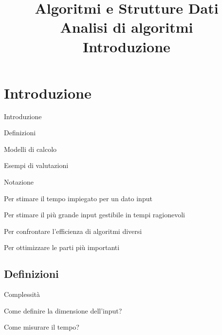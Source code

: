 

\usepackage{epigraph}

\title[ASD - Analisi di algoritmi]{\textbf{Algoritmi e Strutture Dati}\\[24pt]Analisi di algoritmi\\Introduzione}

\graphicspath{{figs/02/}}




\FrameTitle{}

\FrameContent

\section{Introduzione}

\begin{frame}{Introduzione}

\BIL
\item Definizioni
\item Modelli di calcolo
\item Esempi di valutazioni
\item Notazione
\EIL

\BI
\item Per stimare il tempo impiegato per un dato input
\item Per stimare il più grande input gestibile in tempi ragionevoli
\item Per confrontare l'efficienza di algoritmi diversi
\item Per ottimizzare le parti più importanti
\EI
\end{frame}



\subsection{Definizioni}

\begin{frame}{Complessità}

\begin{myboxtitle}
\BI
\item Come definire la dimensione dell'input?
\item Come misurare il tempo?
\EI
\end{myboxtitle}

\end{frame}


